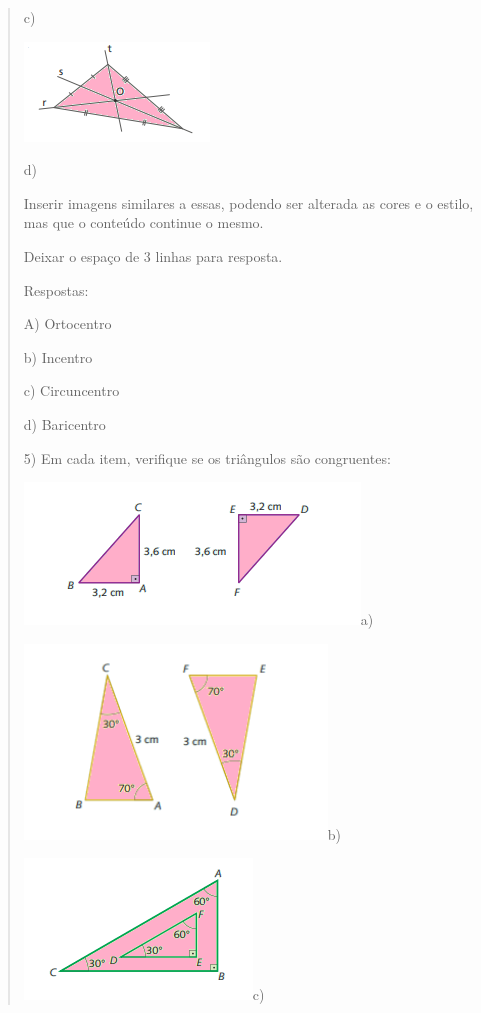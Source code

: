 \begin{quote}
\begin{escolha}
c)

\includegraphics[width=1.9375in,height=1.04167in]{./imgSAEB_8_MAT/media/image18.png}

d)

Inserir imagens similares a essas, podendo ser alterada as cores e o
estilo, mas que o conteúdo continue o mesmo.

Deixar o espaço de 3 linhas para resposta.

Respostas:

A) Ortocentro

b) Incentro

c) Circuncentro

d) Baricentro

5) Em cada item, verifique se os triângulos são congruentes:

\includegraphics[width=3.51042in,height=1.48958in]{./imgSAEB_8_MAT/media/image19.png}a)

\includegraphics[width=3.16667in,height=2.03958in]{./imgSAEB_8_MAT/media/image20.png}b)

\includegraphics[width=2.38542in,height=1.47917in]{./imgSAEB_8_MAT/media/image21.png}c)


\end{escolha}
\end{quote}
